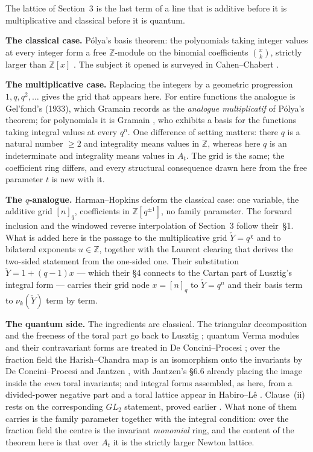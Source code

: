 \documentclass[11pt]{article}
\newcommand{\At}{A_t}
\newcommand{\Yc}{\check Y}
\newcommand{\Z}{\mathbb Z}
\begin{document}
\noindent
The lattice of Section~3 is the last term of a line that is additive before it is multiplicative
and classical before it is quantum.

\medskip\noindent
\textbf{The classical case.} P\'olya's basis theorem: the polynomials taking integer values
at every integer form a free $\Z$-module on the binomial coefficients $\binom{x}{k}$, strictly
larger than $\Z[x]$ \cite[Prop.~1.1]{HarmanHopkins}. The subject it opened is surveyed in
Cahen--Chabert \cite{CahenChabert}.

\medskip\noindent
\textbf{The multiplicative case.} Replacing the integers by a geometric progression $1,q,q^2,\dots$
gives the grid that appears here. For entire functions the analogue is Gel'fond's (1933), which
Gramain records as the \emph{analogue multiplicatif} of P\'olya's theorem; for polynomials it is
Gramain \cite[Prop.~2.2]{Gramain}, who exhibits a basis for the functions taking integral values at
every $q^{n}$. One difference of setting matters: there $q$ is a natural number $\ge 2$ and
integrality means values in $\mathbb Z$, whereas here $q$ is an indeterminate and integrality means
values in $\At$. The grid is the same; the coefficient ring differs, and every structural
consequence drawn here from the free parameter $t$ is new with it.

\medskip\noindent
\textbf{The $q$-analogue.} Harman--Hopkins \cite[\S1, Props.~1.1--1.2]{HarmanHopkins} deform the
classical case: one variable, the additive grid $[n]_q$, coefficients in $\mathbb Z[q^{\pm1}]$, no
family parameter. The forward inclusion and the windowed reverse interpolation of Section~3 follow
their~\S1. What is added here is the passage to the multiplicative grid $\Yc=q^{\chi}$ and to
bilateral exponents $u\in\mathbb Z$, together with the Laurent clearing that derives the two-sided
statement from the one-sided one. Their substitution $\Yc=1+(q-1)x$ --- which their \S4 connects to
the Cartan part of Lusztig's integral form --- carries their grid node $x=[n]_q$ to $\Yc=q^{n}$ and
their basis term to $\nu_k(\Yc)$ term by term.

\medskip\noindent
\textbf{The quantum side.} The ingredients are classical. The triangular decomposition and the
freeness of the toral part go back to Lusztig \cite[\S3.2]{Lusztig}; quantum Verma modules and
their contravariant forms are treated in De Concini--Procesi \cite[\S\S17.1--17.4]{DCP}; over the
fraction field the Harish--Chandra map is an isomorphism onto the invariants by De Concini--Procesi
\cite[\S18.3]{DCP} and Jantzen \cite[Thm.~6.25 and \S6.26]{Jantzen}, with Jantzen's \S6.6 already
placing the image inside the \emph{even} toral invariants; and integral forms assembled, as here,
from a divided-power negative part and a toral lattice appear in Habiro--L\^e \cite[\S8G]{HabiroLe}.
Clause~(ii) rests on the corresponding $GL_2$ statement, proved earlier
\cite{SandboxGL2}. What none of them carries is the family parameter together with the integral
condition: over the fraction field the centre is the invariant \emph{monomial} ring, and the
content of the theorem here is that over $\At$ it is the strictly larger Newton lattice.
\end{document}
